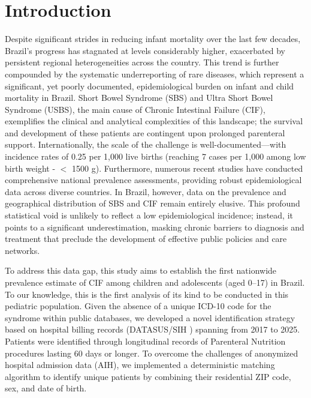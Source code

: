 \documentclass[pdflatex,sn-mathphys-num]{sn-jnl}
\theoremstyle{thmstyleone}%
\theoremstyle{thmstyletwo}%
\theoremstyle{thmstylethree}%
\begin{document}
\maketitle

\section{Introduction}\label{sec1}

Despite significant strides in reducing infant mortality over the last few decades, Brazil's progress has stagnated at levels considerably higher, exacerbated by persistent regional heterogeneities across the country.\cite{unigme2025, brasil2024saes} This trend is further compounded by the systematic underreporting of rare diseases, which represent a significant, yet poorly documented, epidemiological burden on infant and child mortality in Brazil. Short Bowel Syndrome (SBS) and Ultra Short Bowel Syndrome (USBS), the main cause of Chronic Intestinal Failure (CIF), exemplifies the clinical and analytical complexities of this landscape; the survival and development of these patients are contingent upon prolonged parenteral support.\cite{modi2022aspen, elfadil2025ultra} Internationally, the scale of the challenge is well-documented—with incidence rates of 0.25 per 1,000 live births (reaching 7 cases per 1,000 among low birth weight - $<$ 1500 g). \cite{caporilli2023overview, cole2008very, alene2022time} Furthermore, numerous recent studies have conducted comprehensive national prevalence assessments, providing robust epidemiological data across diverse countries.\cite{wales2004neonatal, beath2011trends, puttonen2023pediatric} In Brazil, however, data on the prevalence and geographical distribution of SBS and CIF remain entirely elusive. This profound statistical void is unlikely to reflect a low epidemiological incidence; instead, it points to a significant underestimation, masking chronic barriers to diagnosis and treatment that preclude the development of effective public policies and care networks.\cite{brasil2024saes, leite2025multicenter} 

To address this data gap, this study aims to establish the first nationwide prevalence estimate of CIF among children and adolescents (aged 0–17) in Brazil. To our knowledge, this is the first analysis of its kind to be conducted in this pediatric population.\cite{khokhar2025global} Given the absence of a unique ICD-10 code\cite{who2016icd10} for the syndrome within public databases, we developed a novel identification strategy based on hospital billing records (DATASUS/SIH \citep{datasus_sihsus}) spanning from 2017 to 2025. Patients were identified through longitudinal records of Parenteral Nutrition procedures lasting 60 days or longer. To overcome the challenges of anonymized hospital admission data (AIH), we implemented a deterministic matching algorithm to identify unique patients by combining their residential ZIP code, sex, and date of birth.
\end{document}
